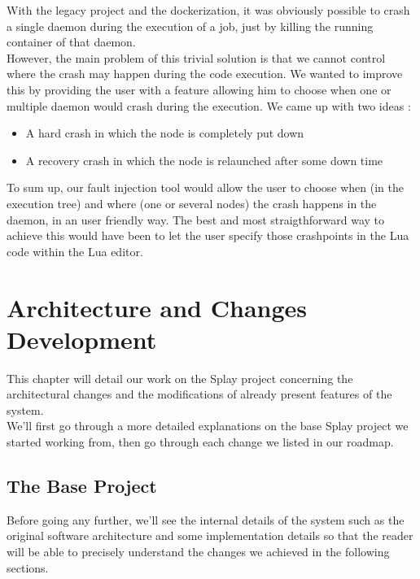 \documentclass{eplmastersthesis}
\begin{document}
          With the legacy project and the dockerization, it was obviously
          possible to crash a single daemon during the execution of a job, just
          by killing the running container of that daemon.\\
          However, the main problem of this trivial solution is that we cannot
          control where the crash may happen during the code execution.
          We wanted to improve this by providing the user with a feature
          allowing him to choose when one or multiple daemon would crash during
          the execution. We came up with two ideas :

          \begin{itemize}
            \item A hard crash in which the node is completely put down
            \item A recovery crash in which the node is relaunched after some
            down time
          \end{itemize}

          To sum up, our fault injection tool would allow the user to choose
          when (in the execution tree) and where (one or several nodes) the
          crash happens in the daemon, in an user friendly way. The best and
          most straigthforward way to achieve this would have been to let
          the user specify those crashpoints in the Lua code within the Lua
          editor.

  \chapter{Architecture and Changes Development}

    This chapter will detail our work on the Splay project concerning the
    architectural changes and the modifications of already present features
    of the system.\\
    We'll first go through a more detailed explanations on the base Splay
    project we started working from, then go through each change we listed
    in our roadmap.

    \section{The Base Project}

      Before going any further, we'll see the internal details of the system
      such as the original software architecture and some implementation
      details so that the reader will be able to precisely understand the
      changes we achieved in the following sections.
\end{document}
